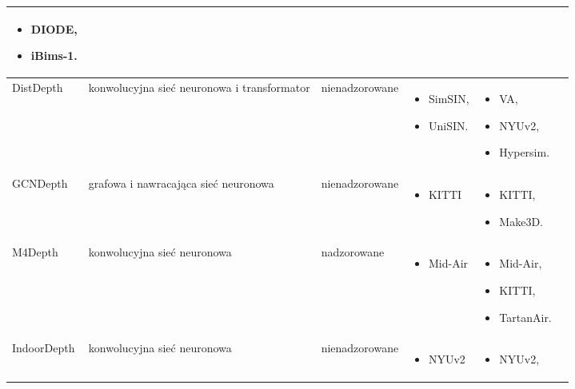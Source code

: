 \begin{table}[H]
{\begin{tabular}{ |l|p{2cm}|p{3cm}|p{5cm}|p{5cm}|r| }
\begin{itemize}
            \item DIODE,
            \item iBims-1.
        \end{itemize}\\
        \hline
        DistDepth &
        konwolucyjna sieć neuronowa i transformator &
        nienadzorowane &
        \begin{itemize}
            \item SimSIN,
            \item UniSIN.
        \end{itemize} & 
        \begin{itemize}
            \item VA,
            \item NYUv2,
            \item Hypersim.
        \end{itemize}\\
        \hline
        GCNDepth &
        grafowa i nawracająca sieć neuronowa &
        nienadzorowane &
        \begin{itemize}
            \item KITTI
        \end{itemize} & 
        \begin{itemize}
            \item KITTI,
            \item Make3D.
        \end{itemize}\\
        \hline
        M4Depth &
        konwolucyjna sieć neuronowa &
        nadzorowane &
        \begin{itemize}
            \item Mid-Air
        \end{itemize} & 
        \begin{itemize}
            \item Mid-Air,
            \item KITTI,
            \item TartanAir.
        \end{itemize}\\
        \hline
        IndoorDepth &
        konwolucyjna sieć neuronowa &
        nienadzorowane &
        \begin{itemize}
            \item NYUv2
        \end{itemize} & 
        \begin{itemize}
            \item NYUv2,

\end{itemize}
\end{tabular}}
\end{table}
